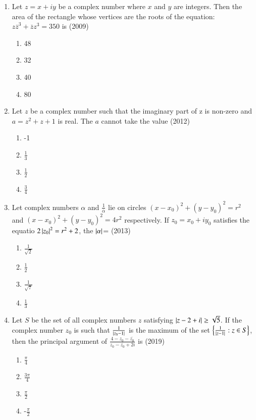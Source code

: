 \documentclass[journal,12pt,twocolumn]{IEEEtran}
\theoremstyle{remark}
\begin{document}
\begin{enumerate}
\item Let $z=x+iy$ be a complex number where $x$ and $y$ are integers. Then the area of the rectangle whose vertices are the roots of the equation: $z\overline{z}^{3}+\overline{z}z^{3}=350$ is \hfill{(2009)}
	\begin{multicols}{4}
\begin{enumerate}[label=(\alph*)]
	\item 48
	\item 32
	\item 40
	\item 80
\end{enumerate}
	\end{multicols}

\item Let $z$ be a complex number such that the imaginary part of z is non-zero and $a=z^{2}+z+1$ is real. The $a$ cannot take the value \hfill{(2012)}
	\begin{multicols}{4}
\begin{enumerate}[label=(\alph*)]
	\item -1
	\item $\frac{1}{3}$
	\item $\frac{1}{2}$
	\item $\frac{3}{4}$
\end{enumerate}
	\end{multicols}

\item Let complex numbers $\alpha$ and $\frac{1}{\overline{\alpha}}$ lie on circles $(x-x_{0})^{2}+(y-y_{0})^{2}=r^{2}$ and $(x-x_{0})^{2}+(y-y_{0})^{2}=4r^{2}$ respectively. If $z_{0}=x_{0}+iy_{0}$ satisfies the equatio  $2\left\vert z_{0}\right\vert ^{2}=r^{2}+2$, the $\left\vert\alpha\right\vert$= \hfill{(2013)}
	\begin{multicols}{4}
\begin{enumerate}[label=(\alph*)]
	\item $\frac{1}{\sqrt{2}}$
	\item $\frac{1}{2}$
	\item $\frac{1}{\sqrt{7}}$
	\item $\frac{1}{3}$
\end{enumerate}
	\end{multicols}

\item Let $S$ be the set of all complex numbers $z$ satisfying $\left\vert z-2+i\right\vert\geq\sqrt{5}$. If the complex number $z_{0}$ is such that $\frac{1}{\left\vert z_{0}-1\right\vert}$ is the maximum of the set  $\left\{\frac{1}{|z-1|} : z \in S\right\}$, then the principal argument of $\frac{4-z_{0}-\overline{z_{0}}}{z_{0}-\overline{z_{0}}+2i}$ is  \hfill{(2019)}
	\begin{multicols}{4}
\begin{enumerate}[label=(\alph*)]
	\item $\frac{\pi}{4}$
	\item $\frac{3\pi}{4}$
	\item $\frac{\pi}{2}$
	\item -$\frac{\pi}{2}$
\end{enumerate}
	\end{multicols}

\end{enumerate}
\end{document}

